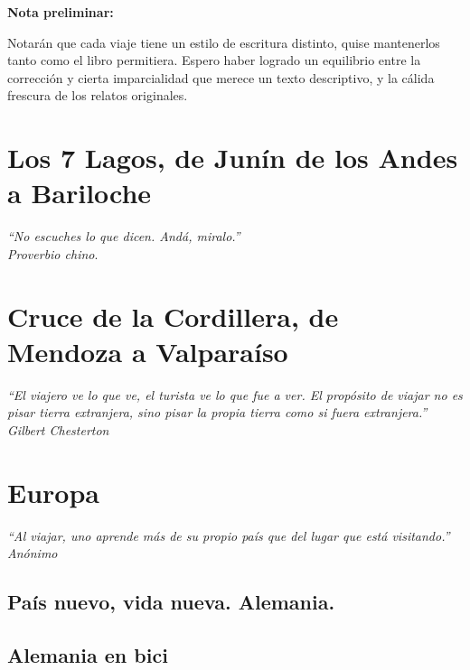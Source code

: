 \documentclass[11pt]{book}
\begin{document}
\textbf{Nota preliminar:}

Notar\'an que cada viaje tiene un estilo de escritura distinto, quise
mantenerlos tanto como el libro permitiera. Espero haber logrado un equilibrio
entre la correcci\'on y cierta imparcialidad que merece un texto descriptivo, y
la c\'alida frescura de los relatos originales.

\mainmatter

\chapter{Los 7 Lagos, de Jun\'in de los Andes a Bariloche}
\begin{flushright}
\item \emph{\small ``No escuches lo que dicen. And\'a, miralo.''\\
Proverbio chino}.
\end{flushright}


\chapter{Cruce de la Cordillera, de Mendoza a Valpara\'iso}
\begin{flushright}
\item \emph{\small ``El viajero ve lo que ve, el turista ve lo que fue a ver.
El prop\'osito de viajar no es pisar tierra extranjera, sino pisar la propia
tierra como si fuera extranjera.''\\
Gilbert Chesterton}
\end{flushright}


\chapter{Europa}
\begin{flushright}
\item \emph{\small ``Al viajar, uno aprende m\'as de su propio pa\'is que del lugar que est\'a visitando.''  \\
An\'onimo}
\end{flushright}

\section{Pa\'is nuevo, vida nueva. Alemania.}

\section{Alemania en bici}

\end{document}
